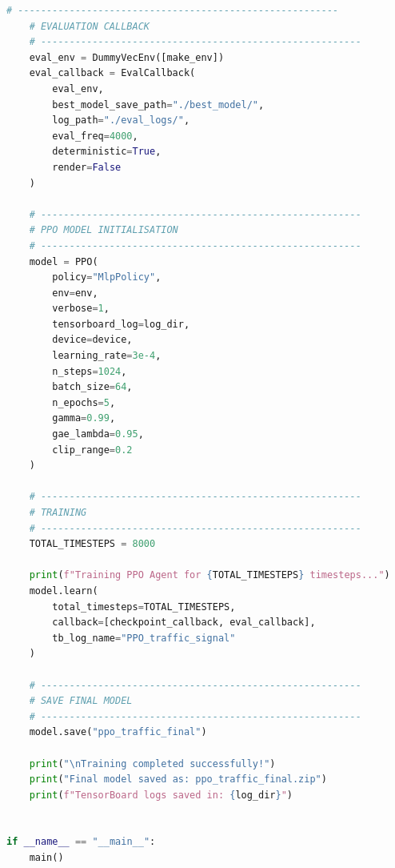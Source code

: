 \documentclass[11pt, a4paper]{report}
\begin{document}
\begin{lstlisting}[language=Python, caption={PPO Training Script --- Tsotlhe N. Seiphepi (ID: 21001137)}]
    # --------------------------------------------------------
    # EVALUATION CALLBACK
    # --------------------------------------------------------
    eval_env = DummyVecEnv([make_env])
    eval_callback = EvalCallback(
        eval_env,
        best_model_save_path="./best_model/",
        log_path="./eval_logs/",
        eval_freq=4000,
        deterministic=True,
        render=False
    )

    # --------------------------------------------------------
    # PPO MODEL INITIALISATION
    # --------------------------------------------------------
    model = PPO(
        policy="MlpPolicy",
        env=env,
        verbose=1,
        tensorboard_log=log_dir,
        device=device,
        learning_rate=3e-4,
        n_steps=1024,
        batch_size=64,
        n_epochs=5,
        gamma=0.99,
        gae_lambda=0.95,
        clip_range=0.2
    )

    # --------------------------------------------------------
    # TRAINING
    # --------------------------------------------------------
    TOTAL_TIMESTEPS = 8000

    print(f"Training PPO Agent for {TOTAL_TIMESTEPS} timesteps...")
    model.learn(
        total_timesteps=TOTAL_TIMESTEPS,
        callback=[checkpoint_callback, eval_callback],
        tb_log_name="PPO_traffic_signal"
    )

    # --------------------------------------------------------
    # SAVE FINAL MODEL
    # --------------------------------------------------------
    model.save("ppo_traffic_final")

    print("\nTraining completed successfully!")
    print("Final model saved as: ppo_traffic_final.zip")
    print(f"TensorBoard logs saved in: {log_dir}")


if __name__ == "__main__":
    main()
\end{lstlisting}
\end{document}
